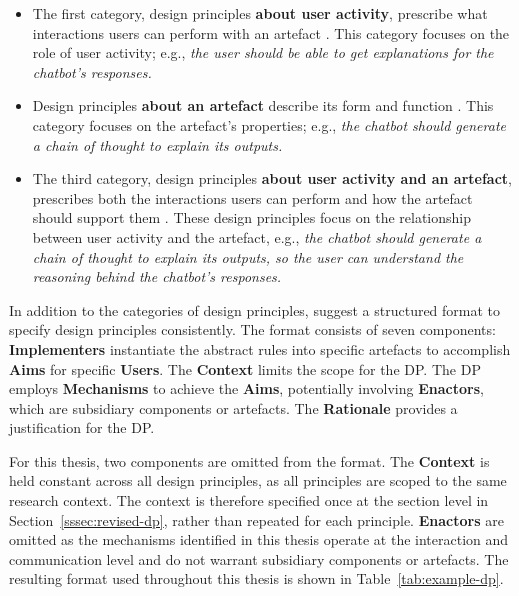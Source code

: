\begin{itemize}
    \item The first category, design principles \textbf{about user activity}, prescribe what interactions users can perform with an artefact \parencite{Gregor2020}. This category focuses on the role of user activity; e.g., \textit{the user should be able to get explanations for the chatbot's responses.}
    \item Design principles \textbf{about an artefact} describe its form and function \parencite{Gregor2020}. This category focuses on the artefact's properties; e.g., \textit{the chatbot should generate a chain of thought to explain its outputs.}
    \item The third category, design principles \textbf{about user activity and an artefact}, prescribes both the interactions users can perform and how the artefact should support them \parencite{Gregor2020}. These design principles focus on the relationship between user activity and the artefact, e.g., \textit{the chatbot should generate a chain of thought to explain its outputs, so the user can understand the reasoning behind the chatbot's responses.}
\end{itemize}

In addition to the categories of design principles, \textcite{Gregor2020} suggest a structured format to specify design principles consistently. The format consists of seven components: \textbf{Implementers} instantiate the abstract rules into specific artefacts to accomplish \textbf{Aims} for specific \textbf{Users}. The \textbf{Context} limits the scope for the \ac{DP}. The \ac{DP} employs \textbf{Mechanisms} to achieve the \textbf{Aims}, potentially involving \textbf{Enactors}, which are subsidiary components or artefacts. The \textbf{Rationale} provides a justification for the \ac{DP}.

For this thesis, two components are omitted from the format. The \textbf{Context} is held constant across all design principles, as all principles are scoped to the same research context. The context is therefore specified once at the section level in Section~\ref{sssec:revised-dp}, rather than repeated for each principle. \textbf{Enactors} are omitted as the mechanisms identified in this thesis operate at the interaction and communication level and do not warrant subsidiary components or artefacts. The resulting format used throughout this thesis is shown in Table~\ref{tab:example-dp}.

